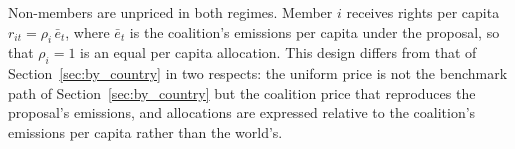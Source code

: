 \documentclass[12pt,english]{article}
\theoremstyle{remark}
\begin{document}
Non-members are unpriced in both regimes. Member $i$ receives rights per capita $r_{it}=\rho_i\,\bar e_t$, where $\bar e_t$ is the coalition's emissions per capita under the proposal, so that $\rho_i=1$ is an equal per capita allocation. This design differs from that of Section~\ref{sec:by_country} in two respects: the uniform price is not the benchmark path of Section~\ref{sec:by_country} but the coalition price that reproduces the proposal's emissions, and allocations are expressed relative to the coalition's emissions per capita rather than the world's.
\end{document}
